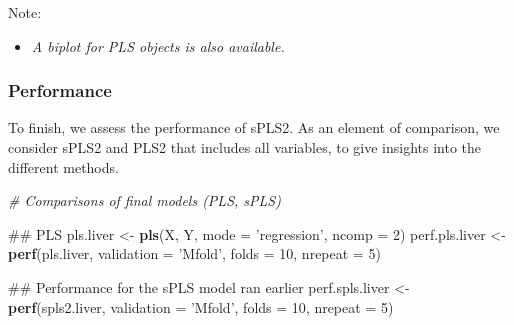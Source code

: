 \documentclass[]{book}
\newenvironment{Shaded}{\begin{snugshade}}{\end{snugshade}}
\newcommand{\KeywordTok}[1]{\textcolor[rgb]{0.13,0.29,0.53}{\textbf{#1}}}
\newcommand{\DataTypeTok}[1]{\textcolor[rgb]{0.13,0.29,0.53}{#1}}
\newcommand{\DecValTok}[1]{\textcolor[rgb]{0.00,0.00,0.81}{#1}}
\newcommand{\StringTok}[1]{\textcolor[rgb]{0.31,0.60,0.02}{#1}}
\newcommand{\CommentTok}[1]{\textcolor[rgb]{0.56,0.35,0.01}{\textit{#1}}}
\newcommand{\NormalTok}[1]{#1}
\providecommand{\tightlist}{%
  \setlength{\itemsep}{0pt}\setlength{\parskip}{0pt}}
\begin{document}
Note:

\begin{itemize}
\tightlist
\item
  \emph{A biplot for PLS objects is also available.}
\end{itemize}

\subsubsection{Performance}\label{performance}

To finish, we assess the performance of sPLS2. As an element of
comparison, we consider sPLS2 and PLS2 that includes all variables, to
give insights into the different methods.

\begin{Shaded}
\begin{Highlighting}[]
\CommentTok{# Comparisons of final models (PLS, sPLS)}

\NormalTok{## PLS}
\NormalTok{pls.liver <-}\StringTok{ }\KeywordTok{pls}\NormalTok{(X, Y, }\DataTypeTok{mode =} \StringTok{'regression'}\NormalTok{, }\DataTypeTok{ncomp =} \DecValTok{2}\NormalTok{)}
\NormalTok{perf.pls.liver <-}\StringTok{  }\KeywordTok{perf}\NormalTok{(pls.liver, }\DataTypeTok{validation =} \StringTok{'Mfold'}\NormalTok{, }\DataTypeTok{folds =} \DecValTok{10}\NormalTok{, }
                        \DataTypeTok{nrepeat =} \DecValTok{5}\NormalTok{)}

\NormalTok{## Performance for the sPLS model ran earlier}
\NormalTok{perf.spls.liver <-}\StringTok{  }\KeywordTok{perf}\NormalTok{(spls2.liver, }\DataTypeTok{validation =} \StringTok{'Mfold'}\NormalTok{, }\DataTypeTok{folds =} \DecValTok{10}\NormalTok{, }
                         \DataTypeTok{nrepeat =} \DecValTok{5}\NormalTok{)}
\end{Highlighting}
\end{Shaded}
\end{document}
